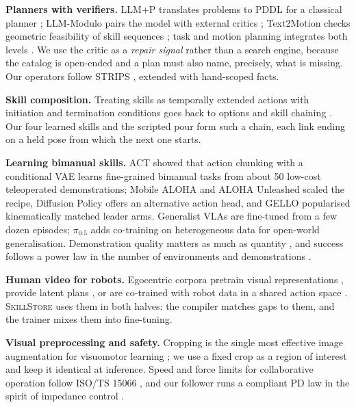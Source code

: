 \documentclass[10pt,twocolumn,letterpaper]{article}
\newcommand{\sys}{\textsc{SkillStore}}
\begin{document}
\textbf{Planners with verifiers.} LLM+P translates problems to PDDL \citep{mcdermott1998pddl} for a classical
planner \citep{liu2023llmp}; LLM-Modulo pairs the model with external critics \citep{kambhampati2024llmmodulo};
Text2Motion checks geometric feasibility of skill sequences \citep{lin2023text2motion}; task and motion planning
integrates both levels \citep{garrett2021tamp}. We use the critic as a \emph{repair signal} rather than a search
engine, because the catalog is open-ended and a plan must also name, precisely, what is missing. Our operators follow
STRIPS \citep{fikes1971strips}, extended with hand-scoped facts.

\textbf{Skill composition.} Treating skills as temporally extended actions with initiation and termination conditions
goes back to options \citep{sutton1999options} and skill chaining \citep{konidaris2009chaining}. Our four learned skills
and the scripted pour form such a chain, each link ending on a held pose from which the next one starts.

\textbf{Learning bimanual skills.} ACT \citep{zhao2023aloha} showed that action chunking with a conditional VAE learns
fine-grained bimanual tasks from about 50 low-cost teleoperated demonstrations; Mobile ALOHA \citep{fu2024mobilealoha}
and ALOHA Unleashed \citep{zhao2024unleashed} scaled the recipe, Diffusion Policy \citep{chi2023diffusion} offers an
alternative action head, and GELLO \citep{wu2024gello} popularised kinematically matched leader arms. Generalist VLAs
\citep{black2024pi0,pi2025pi05,kim2024openvla,octo2024,brohan2023rt2} are fine-tuned from a few dozen episodes;
$\pi_{0.5}$ \citep{pi2025pi05} adds co-training on heterogeneous data for open-world generalisation. Demonstration
quality matters as much as quantity \citep{mandlekar2021matters}, and success follows a power law in the number of
environments and demonstrations \citep{lin2025scaling}.

\textbf{Human video for robots.} Egocentric corpora \citep{damen2022epic,grauman2022ego4d,grauman2024egoexo4d,hoque2025egodex}
pretrain visual representations \citep{nair2022r3m}, provide latent plans \citep{wang2023mimicplay}, or are co-trained
with robot data in a shared action space \citep{kareer2024egomimic,qiu2025humanoid,nvidia2025groot}. \sys{} uses them in
both halves: the compiler matches gaps to them, and the trainer mixes them into fine-tuning.

\textbf{Visual preprocessing and safety.} Cropping is the single most effective image augmentation for visuomotor
learning \citep{laskin2020rad,kostrikov2021drq}; we use a fixed crop as a region of interest and keep it identical at
inference. Speed and force limits for collaborative operation follow ISO/TS 15066 \citep{iso15066}, and our follower
runs a compliant PD law in the spirit of impedance control \citep{hogan1985impedance}.
\end{document}
